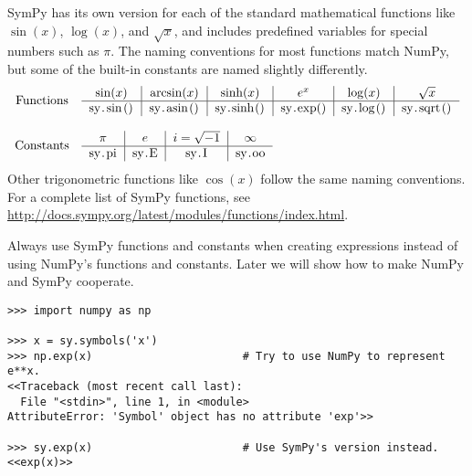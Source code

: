 
SymPy has its own version for each of the standard mathematical functions like $\sin(x)$, $\log(x)$, and $\sqrt{x}$, and includes predefined variables for special numbers such as $\pi$.
The naming conventions for most functions match NumPy, but some of the built-in constants are named slightly differently.
\[
\begin{array}{cl}
\text{Functions}
&
\begin{tabular}{c|c|c|c|c|c}
    $\sin(x)$ & $\arcsin(x)$ & $\sinh(x)$ & $e^x$ & $\log(x)$ & $\sqrt{x}$
    \\ \hline
    \li{sy.sin()} & \li{sy.asin()} & \li{sy.sinh()} & \li{sy.exp()} & \li{sy.log()} & \li{sy.sqrt()}
\end{tabular}
\\ \\
\text{Constants}
&
\begin{tabular}{c|c|c|c}
    $\pi$ & $e$ & $i = \sqrt{-1}$ & $\infty$
    \\ \hline
    \li{sy.pi} & \li{sy.E} & \li{sy.I} & \li{sy.oo}
\end{tabular}
\end{array}
\]
Other trigonometric functions like $\cos(x)$ follow the same naming conventions.
For a complete list of SymPy functions, see \url{http://docs.sympy.org/latest/modules/functions/index.html}.

\begin{warn}
Always use SymPy functions and constants when creating expressions instead of using NumPy's functions and constants.
Later we will show how to make NumPy and SymPy cooperate.
\begin{lstlisting}
>>> import numpy as np

>>> x = sy.symbols('x')
>>> np.exp(x)                       # Try to use NumPy to represent e**x.
<<Traceback (most recent call last):
  File "<stdin>", line 1, in <module>
AttributeError: 'Symbol' object has no attribute 'exp'>>

>>> sy.exp(x)                       # Use SymPy's version instead.
<<exp(x)>>
\end{lstlisting}
\end{warn}

